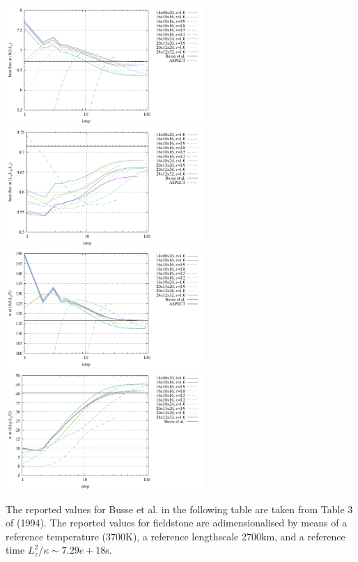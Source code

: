 \begin{center}
\includegraphics[width=7.5cm]{python_codes/fieldstone_20/results/hf1.pdf}
\includegraphics[width=7.5cm]{python_codes/fieldstone_20/results/hf2.pdf}\\
\includegraphics[width=7.5cm]{python_codes/fieldstone_20/results/wmid1.pdf}
\includegraphics[width=7.5cm]{python_codes/fieldstone_20/results/wmid2.pdf}
\end{center}

The reported values for Busse et al. in the following table are taken from Table 3 
of \textcite{bucc94} (1994).
The reported values for fieldstone are adimensionalised by means of a reference temperature (3700K),
a reference lengthscale 2700km, and a reference time $L_z^2/\kappa\sim 7.29e+18$s.


